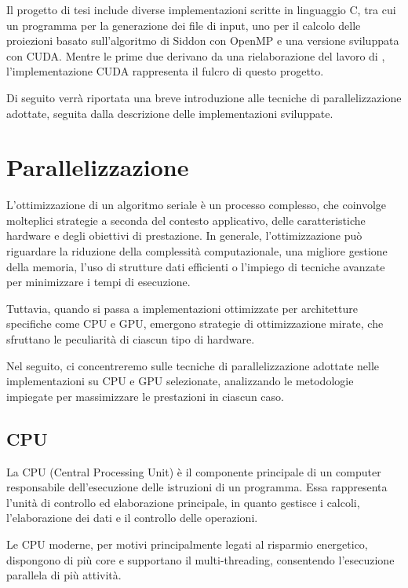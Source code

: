 \documentclass[12pt,a4paper]{report}
\begin{document}
Il progetto di tesi \cite{CudaRepo2025} include diverse implementazioni scritte in linguaggio C, tra cui un programma per la
generazione dei file di input, uno per il calcolo delle proiezioni basato sull'algoritmo di Siddon \cite{Siddon1984} con OpenMP e
una versione sviluppata con CUDA.
Mentre le prime due derivano da una rielaborazione del lavoro di \cite{Colletta2024}, l'implementazione CUDA rappresenta il fulcro
di questo progetto.

Di seguito verrà riportata una breve introduzione alle tecniche di parallelizzazione adottate, seguita dalla descrizione
delle implementazioni sviluppate.

\section{Parallelizzazione}

L'ottimizzazione di un algoritmo seriale è un processo complesso, che coinvolge molteplici strategie a seconda del contesto
applicativo, delle caratteristiche hardware e degli obiettivi di prestazione.
In generale, l'ottimizzazione può riguardare la riduzione della complessità computazionale, una migliore gestione della memoria,
l'uso di strutture dati efficienti o l'impiego di tecniche avanzate per minimizzare i tempi di esecuzione.

Tuttavia, quando si passa a implementazioni ottimizzate per architetture specifiche come CPU e GPU, emergono strategie di
ottimizzazione mirate, che sfruttano le peculiarità di ciascun tipo di hardware.

Nel seguito, ci concentreremo sulle tecniche di parallelizzazione adottate nelle implementazioni su CPU e GPU selezionate,
analizzando le metodologie impiegate per massimizzare le prestazioni in ciascun caso.

\subsection{CPU}

La CPU (Central Processing Unit) è il componente principale di un computer responsabile dell'esecuzione delle istruzioni di un
programma.
Essa rappresenta l'unità di controllo ed elaborazione principale, in quanto gestisce i calcoli, l'elaborazione dei dati e il
controllo delle operazioni.

Le CPU moderne, per motivi principalmente legati al risparmio energetico, dispongono di più core e supportano il multi-threading,
consentendo l'esecuzione parallela di più attività.
\end{document}
